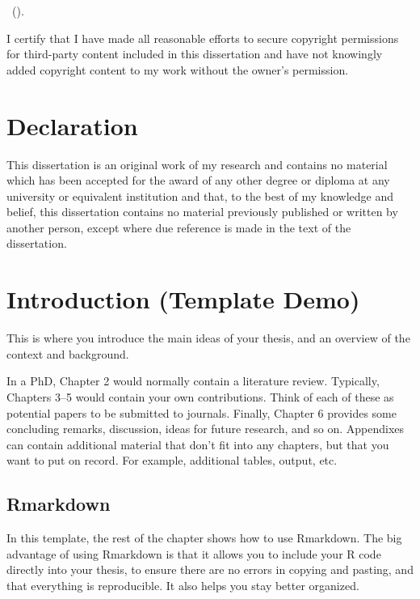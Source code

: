 \documentclass{aucklandthesis}
\begin{document}
\textcopyright { } \authorname~(\number\the\year).

I certify that I have made all reasonable efforts to secure copyright permissions for third-party content included in this dissertation and have not knowingly added copyright content to my work without the owner's permission.

\newpage

\hypertarget{declaration}{%
\chapter*{Declaration}\label{declaration}}

This dissertation is an original work of my research and contains no material which has been accepted for the award of any other degree or diploma at any university or equivalent institution and that, to the best of my knowledge and belief, this dissertation contains no material previously published or written by another person, except where due reference is made in the text of the dissertation.

\clearpage{}\setcounter{page}{0}

\hypertarget{ch:intro}{%
\chapter{Introduction (Template Demo)}\label{ch:intro}}

This is where you introduce the main ideas of your thesis, and an overview of the context and background.

In a PhD, Chapter 2 would normally contain a literature review. Typically, Chapters 3--5 would contain your own contributions. Think of each of these as potential papers to be submitted to journals. Finally, Chapter 6 provides some concluding remarks, discussion, ideas for future research, and so on. Appendixes can contain additional material that don't fit into any chapters, but that you want to put on record. For example, additional tables, output, etc.

\hypertarget{rmarkdown}{%
\section{Rmarkdown}\label{rmarkdown}}

In this template, the rest of the chapter shows how to use Rmarkdown. The big advantage of using Rmarkdown is that it allows you to include your R code directly into your thesis, to ensure there are no errors in copying and pasting, and that everything is reproducible. It also helps you stay better organized.
\end{document}
